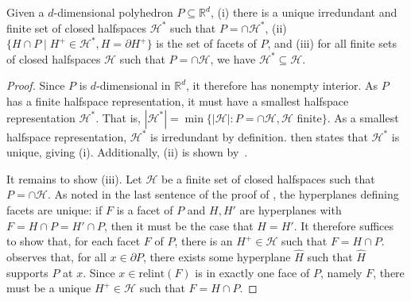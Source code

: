 \documentclass[twoside,11pt]{article}
\newcommand{\Comments}{1}
\newcommand{\mynote}[2]{\ifnum\Comments=1\textcolor{#1}{#2}\fi}
\newcommand{\mytodo}[2]{\ifnum\Comments=1%
  \todo[linecolor=#1!80!black,backgroundcolor=#1,bordercolor=#1!80!black]{#2}\fi}
\newcommand{\raft}[1]{\mytodo{green!20!white}{RF: #1}}
\newcommand{\jessie}[1]{\mynote{teal}{[JF: #1]}}
\newcommand{\reals}{\mathbb{R}}
\renewcommand{\H}{\mathcal{H}}
\newcommand{\relint}{\mathrm{relint}}
\begin{document}
\begin{theorem}\label{thm:polyhedron-uniquely-gen-facets}
  Given a $d$-dimensional polyhedron $P \subseteq \reals^d$, 
  (i) there is a unique irredundant and finite set of closed halfspaces $\H^*$ such that $P = \cap \H^*$, 
  (ii) $\{H \cap P \mid H^+ \in \H^*, H = \partial H^+\}$ is the set of facets of $P$, and
  (iii) for all finite sets of closed halfspaces $\H$ such that $P = \cap \H$, we have $\H^* \subseteq \H$.
\end{theorem}
\begin{proof}
	Since $P$ is $d$-dimensional in $\reals^d$, it therefore has nonempty interior.
	As $P$ has a finite halfspace representation, it must have a smallest halfspace representation $\H^*$.
	That is, $|\H^*| = \min \{|\H| : P = \cap \H, \H$ finite$\}$.
	As a smallest halfspace representation, $\H^*$ is irredundant by definition.
	\citet[Proposition 4.5(i)]{gallier2008notes} then states that $\H^*$ is unique, giving (i).
	Additionally, (ii) is shown by~\citep[Proposition 4.5(ii)]{gallier2008notes}.
	

	It remains to show (iii).
	Let $\H$ be a finite set of closed halfspaces such that $P = \cap \H$.
  As noted in the last sentence of the proof of \citep[Proposition 4.5]{gallier2008notes},
  the hyperplanes defining facets are unique:
  if $F$ is a facet of $P$ and $H,H'$ are hyperplanes with $F = H \cap P = H' \cap P$, then it must be the case that $H = H'$.
	It therefore suffices to show that, for each facet $F$ of $P$, there is an $H^+ \in \H$ such that $F = H\cap P$.
  \citet[Proposition 3.17]{gallier2008notes} observes that, for all $x \in \partial P$, there exists some hyperplane $\hat H$ such that $\hat H$ supports $P$ at $x$.
	Since $x \in \relint(F)$ is in exactly one face of $P$, namely $F$, there must be a unique $H^+ \in \H$ such that $F = H \cap P$.
\end{proof}
\end{document}
